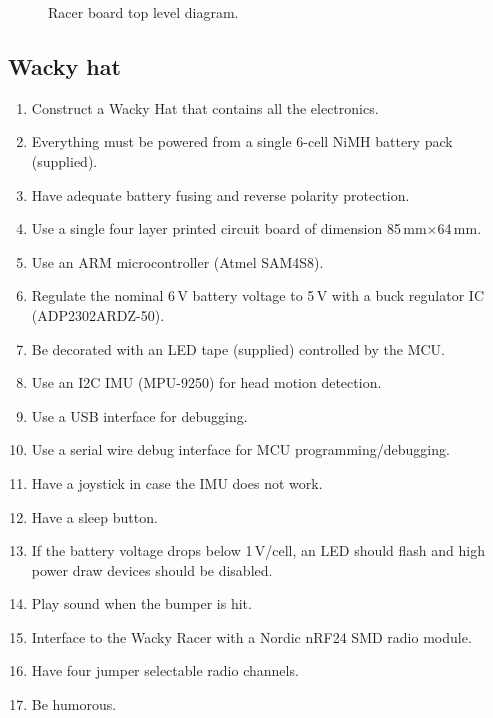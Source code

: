 \documentclass[11pt, a4paper]{article}
\begin{document}
\vspace{1cm}

\begin{figure}[h]
    \centering
    
    \caption{Racer board top level diagram.}
\end{figure}


\vfill\pagebreak

\subsection{Wacky hat}


\begin{enumerate}
\item Construct a Wacky Hat that contains all the electronics.
\item Everything must be powered from a single 6-cell NiMH battery pack (supplied).  
\item Have adequate battery fusing and reverse polarity protection.
\item Use a single four layer printed circuit board of dimension 85\,mm$\times$64\,mm.  
\item Use an ARM microcontroller (Atmel SAM4S8).
\item Regulate the nominal 6\,V battery voltage to 5\,V with a buck
  regulator IC (ADP2302ARDZ-50).
\item Be decorated with an LED tape (supplied) controlled by the MCU.
\item Use an I2C IMU (MPU-9250) for head motion detection.
\item Use a USB interface for debugging.
\item Use a serial wire debug interface for MCU programming/debugging.
\item Have a joystick in case the IMU does not work.
\item Have a sleep button.
\item If the battery voltage drops below 1\,V/cell, an LED should flash and high power draw devices should be disabled.
\item Play sound when the bumper is hit.
\item Interface to the Wacky Racer with a Nordic nRF24 SMD radio module.  
\item Have four jumper selectable radio channels.    
\item Be humorous.  
\end{enumerate}

\end{document}
